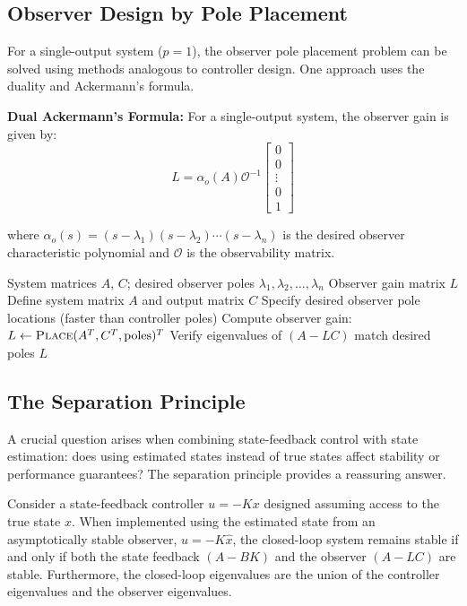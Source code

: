 \subsection{Observer Design by Pole Placement}

For a single-output system ($p = 1$), the observer pole placement problem can be solved using methods analogous to controller design. One approach uses the duality and Ackermann's formula.

\textbf{Dual Ackermann's Formula:} For a single-output system, the observer gain is given by:
\begin{equation}
L = \alpha_o(A) \mathcal{O}^{-1} \begin{bmatrix} 0 \\ 0 \\ \vdots \\ 0 \\ 1 \end{bmatrix}
\label{eq:ackermann_observer}
\end{equation}

where $\alpha_o(s) = (s - \lambda_1)(s - \lambda_2) \cdots (s - \lambda_n)$ is the desired observer characteristic polynomial and $\mathcal{O}$ is the observability matrix.

\begin{algorithm}
\caption{Observer Pole Placement}
\begin{algorithmic}[1]
\Require System matrices $A$, $C$; desired observer poles $\lambda_1, \lambda_2, \ldots, \lambda_n$
\Ensure Observer gain matrix $L$
\State Define system matrix $A$ and output matrix $C$
\State Specify desired observer pole locations (faster than controller poles)
\State Compute observer gain: $L \leftarrow \textsc{Place}(A^T, C^T, \text{poles})^T$
\State Verify eigenvalues of $(A - LC)$ match desired poles
\State \Return $L$
\end{algorithmic}
\end{algorithm}

\subsection{The Separation Principle}

A crucial question arises when combining state-feedback control with state estimation: does using estimated states instead of true states affect stability or performance guarantees? The separation principle provides a reassuring answer.

\begin{theorem}
Consider a state-feedback controller $u = -Kx$ designed assuming access to the true state $x$. When implemented using the estimated state from an asymptotically stable observer, $u = -K\hat{x}$, the closed-loop system remains stable if and only if both the state feedback $(A - BK)$ and the observer $(A - LC)$ are stable. Furthermore, the closed-loop eigenvalues are the union of the controller eigenvalues and the observer eigenvalues.
\end{theorem}

